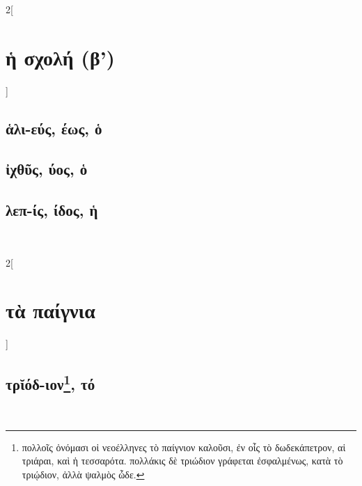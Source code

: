 \documentclass{book}
\begin{document}
\begin{multicols}{2}[\section{ἡ σχολή (β')}]
\subsection{ἁλι-εύς, έως, ὁ}
\subsection{ἰχθῦς, ύος, ὁ}
\subsection{λεπ-ίς, ίδος, ἡ}
~
\end{multicols}
\newpage
\begin{multicols}{2}[\section{τὰ παίγνια}] 
\subsection{τρῐόδ-ιον\textsuperscript{\textdaggerdbl}\protect\footnote{πολλοῖς ὀνόμασι οἱ νεοέλληνες τὸ παίγνιον καλοῦσι, ἐν οἷς τὸ δωδεκάπετρον, αἱ τριάραι, καὶ ἡ τεσσαρότα. πολλάκις δὲ τριώδιον γράφεται ἐσφαλμένως, κατὰ τὸ τριῴδιον, ἀλλὰ ψαλμὸς ὧδε.}, τό} %
~
\end{multicols}
\newpage
\end{document}
